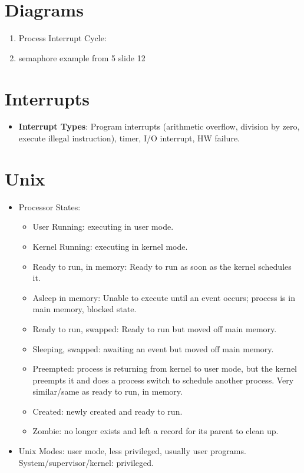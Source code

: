 \documentclass[fontsize=5pt]{scrartcl}
\begin{document}
\begin{multicols}{3}
  \section{Diagrams}
    \begin{enumerate}
      \item Process Interrupt Cycle: 
      \item semaphore example from 5 slide 12
    \end{enumerate}
    
   \section{Interrupts}
      \begin{itemize}
        \item \textbf{Interrupt Types}: Program interrupts (arithmetic overflow, division by zero, execute illegal instruction), timer, I/O interrupt, HW failure.
      \end{itemize}
    \section{Unix}
      \begin{itemize}
       \item Processor States:
        \begin{itemize}
         \item User Running: executing in user mode.
         \item Kernel Running: executing in kernel mode.
         \item Ready to run, in memory: Ready to run as soon as the kernel schedules it.
         \item Asleep in memory: Unable to execute until an event occurs; process is in main memory, blocked state.
         \item Ready to run, swapped: Ready to run but moved off main memory.
         \item Sleeping, swapped: awaiting an event but moved off main memory.
         \item Preempted: process is returning from kernel to user mode, but the kernel preempts it and does a process switch
               to schedule another process. Very similar/same as ready to run, in memory.
         \item Created: newly created and ready to run.
         \item Zombie: no longer exists and left a record for its parent to clean up.
        \end{itemize}
        \item Unix Modes: user mode, less privileged, usually user programs. System/supervisor/kernel: privileged.
      \end{itemize}
      

\end{multicols}
\end{document}
